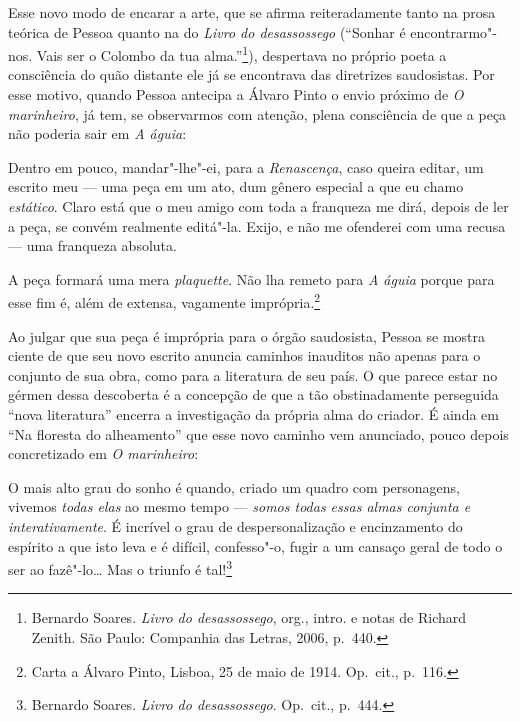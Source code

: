 Esse novo modo de encarar a arte,
que se afirma reiteradamente tanto na
prosa teórica de Pessoa quanto na do
\textit{Livro do desassossego}
(“Sonhar é encontrarmo"-nos. Vais ser o Colombo da
tua alma.”\footnote{ Bernardo Soares. 
\textit{Livro do desassossego}, org., intro. e notas
de Richard Zenith. São Paulo:
Companhia das Letras, 2006, p.~440.}),
despertava no próprio poeta a consciência
do quão distante ele já se
encontrava das diretrizes saudosistas.
Por esse motivo, quando Pessoa
antecipa a Álvaro Pinto o envio próximo de
\textit{O marinheiro}, já
tem, se observarmos com atenção, plena
consciência de que a peça não
poderia sair em \textit{A águia}: 

\begin{hedraquote}
Dentro em pouco, mandar"-lhe"-ei, para a \textit{Renascença}, caso queira
editar, um escrito meu --- uma peça em um ato, dum gênero especial a que
eu chamo \textit{estático}. Claro está que o meu amigo com toda a
franqueza me dirá, depois de ler a peça, se convém realmente editá"-la.
Exijo, e não me ofenderei com uma recusa --- uma franqueza absoluta.

A peça formará uma mera \textit{plaquette}. Não lha remeto para
\textit{A águia} porque para esse fim é, além de extensa, vagamente
imprópria.\footnote{ Carta a Álvaro Pinto,
Lisboa, 25 de maio de 1914.
Op.~cit., p.~116.}
\end{hedraquote}

Ao julgar que sua peça é imprópria para o órgão saudosista, Pessoa se
mostra ciente de que seu novo escrito anuncia caminhos inauditos não
apenas para o conjunto de sua obra, como para a literatura de seu país.
O que parece estar no gérmen dessa descoberta é a concepção de que a
tão obstinadamente perseguida “nova literatura” encerra a investigação
da própria alma do criador. É ainda em “Na floresta do alheamento” que
esse novo caminho vem anunciado, pouco depois
concretizado em \textit{O marinheiro}:

\begin{hedraquote}
O mais alto grau do sonho é quando, criado um quadro com personagens,
vivemos \textit{todas elas} ao mesmo tempo --- \textit{somos todas essas
almas conjunta e interativamente}. É incrível o grau de
despersonalização e encinzamento do espírito a que isto leva e é
difícil, confesso"-o, fugir a um cansaço geral de todo o ser ao
fazê"-lo\ldots{} Mas o triunfo é tal!\footnote{ Bernardo Soares. 
\textit{Livro do desassossego}. Op.~cit., p.~444.} 
\end{hedraquote}

